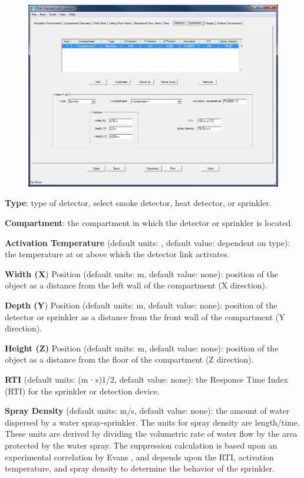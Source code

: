 \begin{figure}[h!]
\begin{center}
\includegraphics[width=6.5in]{FIGURES/Input_File/Detector_Tab}
\end{center}
\end{figure}

\textbf{Type}: type of detector, select smoke detector, heat detector, or sprinkler.

\textbf{Compartment}: the compartment in which the detector or sprinkler is located.

\textbf{Activation Temperature} (default units: \degc, default value: dependent on type): the temperature at or above which the detector link activates.

\textbf{Width (X}) Position (default units: m, default value: none): position of the object as a distance from the left wall of the compartment (X direction).

\textbf{Depth (Y}) Position (default units: m, default value: none): position of the detector or sprinkler as a distance from the front wall of the compartment (Y direction).

\textbf{Height (Z)} Position (default units: m, default value: none): position of the object as a distance from the floor of the compartment (Z direction).

\textbf{RTI} (default units: (m ∙ s)1/2, default value: none): the Response Time Index (RTI) for the sprinkler or detection device.

\textbf{Spray Density} (default units: m/s, default value: none): the amount of water dispersed by a water spray-sprinkler.  The units for spray density are length/time.  These units are derived by dividing the volumetric rate of water flow by the area protected by the water spray. The suppression calculation is based upon an experimental correlation by Evans , and depends upon the RTI, activation temperature, and spray density to determine the behavior of the sprinkler.

